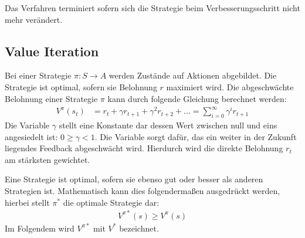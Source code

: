 \documentclass[10pt]{scrartcl}
\begin{document}
Das Verfahren terminiert sofern sich die Strategie beim Verbesserungsschritt nicht mehr verändert.

\subsection{Value Iteration}
Bei einer Strategie $\pi : S \rightarrow A $ werden Zustände auf Aktionen abgebildet. Die Strategie ist optimal, sofern sie Belohnung $r$ maximiert wird. Die abgeschwächte Belohnung einer Strategie $\pi$ kann durch folgende Gleichung berechnet werden:
\begin{align}\label{gleichungvp}
V^{\pi}(s_t) &= r_t + \gamma r_{t+1} + \gamma^2r_{t+2} + ... = \sum^{\infty}_{i=0} \gamma^ir_{t+1}
\end{align}
Die Variable $\gamma$ stellt eine Konstante dar dessen Wert zwischen null und eins angesiedelt ist: $0 \geq \gamma < 1$. Die Variable sorgt dafür, das ein weiter in der Zukunft liegendes Feedback abgeschwächt wird. Hierdurch wird die direkte Belohnung $r_t$ am stärksten gewichtet.

Eine Strategie ist optimal, sofern sie ebenso gut oder besser als anderen Strategien ist. 
Mathematisch kann dies folgendermaßen ausgedrückt werden, hierbei stellt $\pi^*$ die optimale Strategie dar:
\begin{align}\label{voptimal}
V^{\pi*}(s)\geq V^\pi(s)
\end{align}
Im Folgendem wird $V^{\pi*}$ mit $V^*$ bezeichnet.
\end{document}
